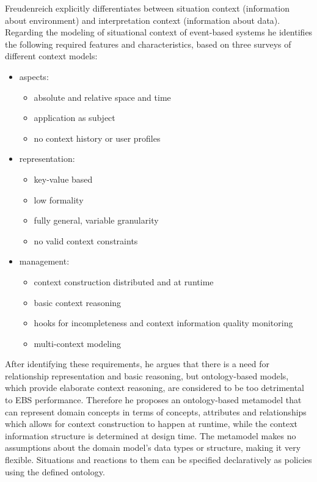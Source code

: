 Freudenreich explicitly differentiates between situation context (information about environment) and interpretation context (information about data). Regarding the modeling of situational context of event-based systems he identifies the following required features and characteristics, based on three surveys of different context models: 
\begin{itemize}
\item aspects:
\begin{itemize}
\item absolute and relative space and time 
\item application as subject
\item no context history or user profiles
\end{itemize}
\item representation: 
\begin{itemize}
\item key-value based
\item low formality
\item fully general, variable granularity
\item no valid context constraints
\end{itemize}
\item management: 
\begin{itemize}
\item context construction distributed and at runtime
\item basic context reasoning
\item hooks for incompleteness and context information quality monitoring
\item multi-context modeling
\end{itemize}
\end{itemize}
After identifying these requirements, he argues that there is a need for relationship representation and basic reasoning, but ontology-based models, which provide elaborate context reasoning, are considered to be too detrimental to EBS performance. Therefore he proposes an ontology-based metamodel that can represent domain con\gls{cep}ts in terms of con\gls{cep}ts, attributes and relationships which allows for context construction to happen at runtime, while the context information structure is determined at design time. The metamodel makes no assumptions about the domain model's data types or structure, making it very flexible. Situations and reactions to them can be specified declaratively as policies using the defined ontology.


